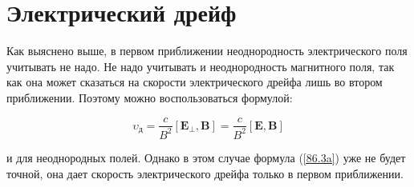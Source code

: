 
	
	
	
	
	




\section{Электрический дрейф}

Как выяснено выше, в первом приближении неоднородность электрического 
поля учитывать не надо. Не надо учитывать и неоднородность магнитного поля, 
так как она может сказаться на скорости электрического дрейфа лишь во 
втором приближении. Поэтому можно воспользоваться формулой:

\begin{equation}
	\upsilon_\text{д} = \frac{c}{B^2} [\mathbf{E_\perp}, \mathbf{B}] = \frac{c}{B^2} [\mathbf{E}, \mathbf{B}]
	\label{86.3a}	
\end{equation}

и для 
неоднородных полей. Однако в этом случае формула (\ref{86.3a}) уже не 
будет точной, она дает скорость электрического дрейфа только в первом приближении. 
\

